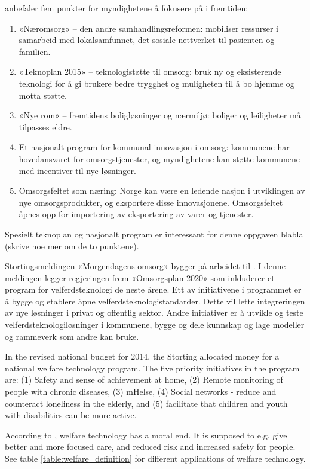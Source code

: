 \citet{regjeringen_hagen} anbefaler fem punkter for myndighetene å fokusere på i fremtiden:

\begin{enumerate}
    \item «Næromsorg» -- den andre samhandlingsreformen: mobiliser ressurser i samarbeid med
    lokalsamfunnet, det sosiale nettverket til pasienten og familien.
    \item «Teknoplan 2015» -- teknologistøtte til omsorg: bruk ny og eksisterende teknologi for å gi brukere
    bedre trygghet og muligheten til å bo hjemme og motta støtte.
    \item «Nye rom» -- fremtidens boligløsninger og nærmiljø: boliger og leiligheter må tilpasses eldre.
    \item Et nasjonalt program for kommunal innovasjon i omsorg: kommunene har hovedansvaret for omsorgstjenester,
    og myndighetene kan støtte kommunene med incentiver til nye løsninger.
    \item Omsorgsfeltet som næring: Norge kan være en ledende nasjon i utviklingen av nye omsorgsprodukter, og
    eksportere disse innovasjonene. Omsorgsfeltet åpnes opp for importering av eksportering av varer og tjenester.
\end{enumerate}

Spesielt teknoplan og nasjonalt program er interessant for denne oppgaven blabla (skrive noe mer om de to punktene).

Stortingsmeldingen «Morgendagens omsorg» bygger på arbeidet til \citet{regjeringen_hagen} \citet{morgendagens_omsorg}.
I denne meldingen legger regjeringen frem «Omsorgsplan 2020» som inkluderer et program for velferdsteknologi de neste årene.
Ett av initiativene i programmet er å bygge og etablere åpne velferdsteknologistandarder. Dette vil lette integreringen av nye
løsninger i privat og offentlig sektor. Andre initiativer er å utvikle og teste velferdsteknologiløsninger i kommunene,
bygge og dele kunnskap og lage modeller og rammeverk som andre kan bruke.

In the revised national budget for 2014, the Storting allocated money for a national welfare technology program. The
five priority initiatives in the program are: (1) Safety and sense of achievement at home, (2) Remote monitoring of
people with chronic diseases, (3) mHelse, (4) Social networks - reduce and counteract loneliness in the elderly, and (5)
facilitate that children and youth with disabilities can be more active.

According to \citet{welfare_ethical}, welfare technology has a moral end. It is supposed to
e.g. give better and more focused care, and reduced risk and increased safety for people. See table
\ref{table:welfare_definition} for different applications of welfare technology. 

